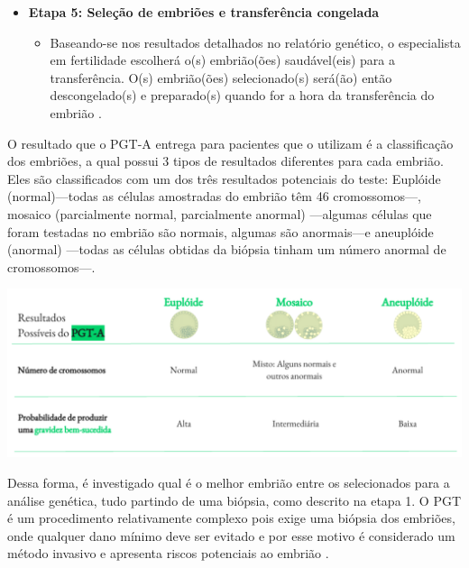 \begin{itemize}
    \item \textbf{Etapa 5: Seleção de embriões e transferência congelada}
    \begin{itemize}
        \item Baseando-se nos resultados detalhados no relatório genético, o especialista em fertilidade escolherá o(s) embrião(ões) saudável(eis) para a transferência. O(s) embrião(ões) selecionado(s) será(ão) então descongelado(s) e preparado(s) quando for a hora da transferência do embrião \cite{cnyfertility2024}. 
    \end{itemize}
\end{itemize}

O resultado que o PGT-A entrega para pacientes que o utilizam é a classificação dos embriões, a qual possui 3 tipos de resultados diferentes para cada embrião. Eles são classificados com um dos três resultados potenciais do teste: Euplóide (normal)—todas as células amostradas do embrião têm 46 cromossomos—, mosaico (parcialmente normal, parcialmente anormal) —algumas células que foram testadas no embrião são normais, algumas são anormais—e aneuplóide (anormal) —todas as células obtidas da biópsia tinham um número anormal de cromossomos—\cite{cnyfertility2024}.

\begin{center}
    \includegraphics[scale=0.5]{figuras/ResultadosPGT.pdf}
\end{center}


Dessa forma, é investigado qual é o melhor embrião entre os selecionados para a análise genética, tudo partindo de uma biópsia, como descrito na etapa 1. O PGT é um procedimento relativamente complexo pois exige uma biópsia dos embriões, onde qualquer dano mínimo deve ser evitado e por esse motivo é considerado um método invasivo e apresenta riscos potenciais ao embrião \cite{yang2024}.

